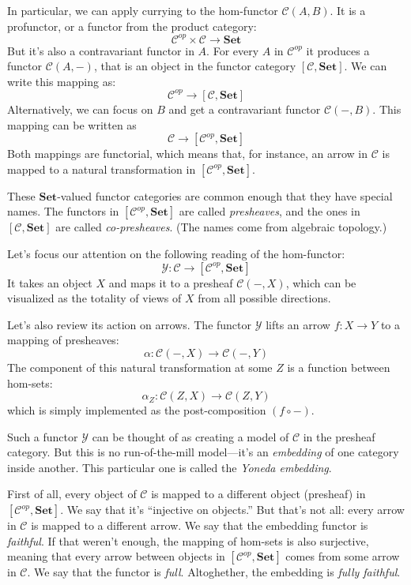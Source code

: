 \documentclass[DaoFP]{subfiles}
\begin{document}
In particular, we can apply currying to the hom-functor $\mathcal{C}(A, B)$. It is a profunctor, or a functor from the product category:
\[ \mathcal{C}^{op} \times \mathcal{C} \to  \mathbf{Set} \]
But it's also a contravariant functor in $A$. For every $A$ in  $\mathcal{C}^{op}$  it produces a functor $\mathcal{C}(A, -)$, that is an object in the functor category $ [\mathcal{C},  \mathbf{Set}] $. We can write this mapping as:
\[ \mathcal{C}^{op} \to [\mathcal{C},  \mathbf{Set}] \]
Alternatively, we can focus on $B$ and get a contravariant functor $\mathcal{C}(-, B)$. This mapping can be written as
\[ \mathcal{C} \to [\mathcal{C}^{op},  \mathbf{Set}] \]
Both mappings are functorial, which means that, for instance, an arrow in $\mathcal{C}$ is mapped to a natural transformation in $[\mathcal{C}^{op},  \mathbf{Set}]$.

These $\mathbf{Set}$-valued functor categories are common enough that they have special names. The functors in $[\mathcal{C}^{op},  \mathbf{Set}]$ are called \emph{presheaves}, and the ones in $[\mathcal{C},  \mathbf{Set}]$ are called \emph{co-presheaves}. (The names come from algebraic topology.)

Let's focus our attention on the following reading of the hom-functor:
\[ \mathcal{Y} \colon \mathcal{C} \to [\mathcal{C}^{op},  \mathbf{Set}] \]
It takes an object $X$ and maps it to a presheaf $\mathcal{C}(-, X)$, which can be visualized as the totality of views of $X$ from all possible directions.

Let's also review its action on arrows. The functor $\mathcal{Y}$ lifts an arrow $f \colon X \to Y$ to a mapping of presheaves:
\[ \alpha \colon \mathcal{C}(-, X) \to \mathcal{C}(-, Y) \]
The component of this natural transformation at some $Z$ is a function between hom-sets:
\[ \alpha_Z \colon \mathcal{C}(Z, X) \to \mathcal{C}(Z, Y) \]
which is simply implemented as the post-composition $(f \circ -)$.

Such a functor $\mathcal{Y}$ can be thought of as creating a model of $\mathcal{C}$ in the presheaf category. But this is no run-of-the-mill model---it's an \emph{embedding} of one category inside another. This particular one is called the \emph{Yoneda embedding}. 

First of all, every object of $\mathcal{C}$ is mapped to a different object (presheaf) in $[\mathcal{C}^{op},  \mathbf{Set}]$. We say that it's ``injective on objects.'' But that's not all: every arrow in $\mathcal{C}$ is mapped to a different arrow. We say that the embedding functor is \emph{faithful}. If that weren't enough, the mapping of hom-sets is also surjective, meaning that every arrow between objects in $[\mathcal{C}^{op},  \mathbf{Set}]$ comes from some arrow in $\mathcal{C}$. We say that the functor is \emph{full}. Altoghether, the embedding is \emph{fully faithful}.
\end{document}
